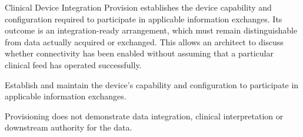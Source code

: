 Clinical Device Integration Provision establishes the device capability and configuration required to participate in applicable information exchanges. Its outcome is an integration-ready arrangement, which must remain distinguishable from data actually acquired or exchanged. This allows an architect to discuss whether connectivity has been enabled without assuming that a particular clinical feed has operated successfully.



Establish and maintain the device’s capability and configuration to participate in applicable information exchanges.



Provisioning does not demonstrate data integration, clinical interpretation or downstream authority for the data.


